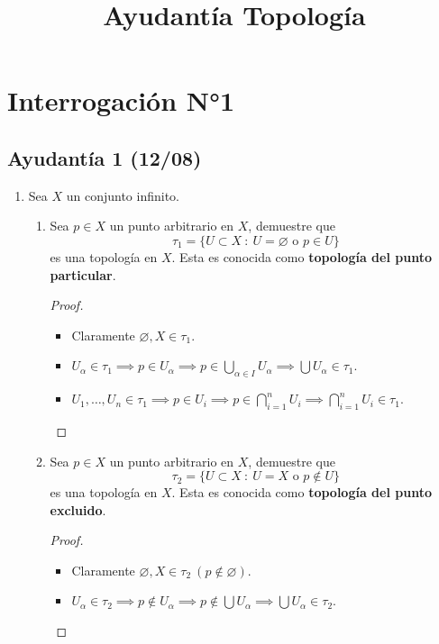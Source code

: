 \documentclass[a4paper]{report}
\title{Ayudantía Topología}
\author{}
\date{}
\begin{document}
\maketitle
\tableofcontents

\chapter{Interrogación N°1}
\section{Ayudantía 1 (12/08)}

\begin{enumerate}
	\item Sea $X$ un conjunto infinito.
	\begin{enumerate}
		\item Sea $p \in X$ un punto arbitrario en $X$, demuestre que
		\[
		\tau_1 = \{ U \subset X \ : \ U = \varnothing \text{ o } p \in U \}
		\]
		es una topología en $X$. Esta es conocida como \textbf{topología del punto particular}.
		\begin{proof}~
			\begin{itemize}
				\item Claramente $\varnothing, X \in \tau_1$.

				\item $U_{\alpha} \in \tau_1 \implies p \in U_{\alpha} \implies p \in \bigcup_{\alpha \in I} U_{\alpha} \implies \bigcup U_{\alpha} \in \tau_1$.

				\item $U_1,\dots,U_n \in \tau_1 \implies p \in U_i \implies p \in \displaystyle\bigcap_{i=1}^{n} U_i \implies \displaystyle\bigcap_{i=1}^{n} U_i \in \tau_1$.
			\end{itemize}
		\end{proof}

		\item Sea $p \in X$ un punto arbitrario en $X$, demuestre que
		\[
		\tau_2 = \{ U \subset X \ : \ U = X \text{ o } p \not\in U \}
		\]
		es una topología en $X$. Esta es conocida como \textbf{topología del punto excluido}.
		\begin{proof}~
			\begin{itemize}
				\item Claramente $\varnothing, X \in \tau_2 \ (p \not\in \varnothing)$.

				\item $U_{\alpha} \in \tau_2 \implies p \not\in U_{\alpha} \implies p \not\in \bigcup U_{\alpha} \implies \bigcup U_{\alpha} \in \tau_2$.


\end{itemize}
\end{proof}
\end{enumerate}
\end{enumerate}
\end{document}
